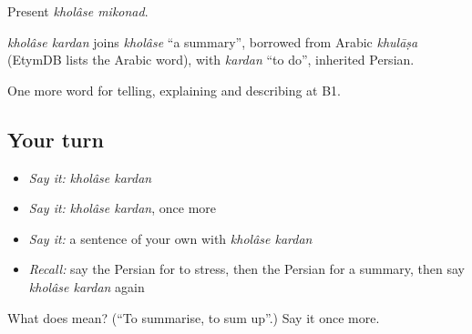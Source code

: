 Present \emph{kholâse mikonad}.

\begin{cousinweb}
\emph{kholâse kardan} joins \emph{kholâse} \textquotedblleft{}a summary\textquotedblright{}, borrowed from Arabic \emph{khulāṣa} (EtymDB lists the Arabic word), with \emph{kardan} \textquotedblleft{}to do\textquotedblright{}, inherited Persian.
\end{cousinweb}

\begin{grammarlens}[title={What you've built}]
One more word for telling, explaining and describing at B1.
\end{grammarlens}

\subsection*{Your turn}
\begin{itemize}
\raggedright
  \item \emph{Say it:} \emph{kholâse kardan}
  \item \emph{Say it:} \emph{kholâse kardan}, once more
  \item \emph{Say it:} a sentence of your own with \emph{kholâse kardan}
  \item \emph{Recall:} say the Persian for to stress, then the Persian for a summary, then say \emph{kholâse kardan} again
\end{itemize}

\begin{tcolorbox}[breakable,colback=teal!4,colframe=teal!35!black,title={Before you move on}]
What does   mean? (\textquotedblleft{}To summarise, to sum up\textquotedblright{}.) Say it once more.
\end{tcolorbox}
